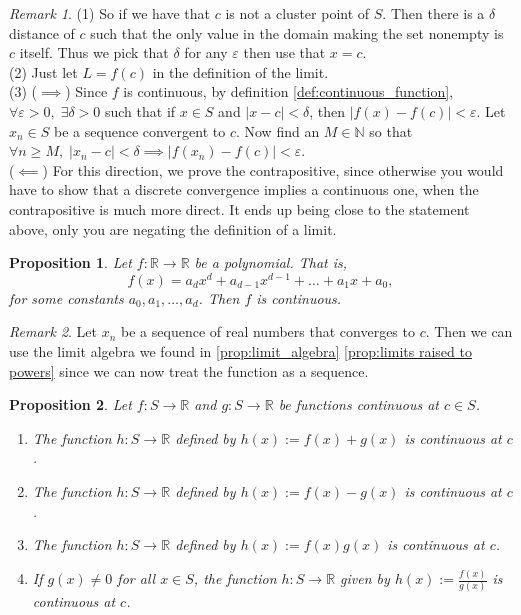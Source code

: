 \documentclass{article}
\newtheorem{proposition}{Proposition}[section]
\theoremstyle{definition}
\theoremstyle{remark}
\newtheorem{remark}{Remark}[section]
\begin{document}
\begin{remark}
(1) \; So if we have that $c$ is not a cluster point of $S$. 
Then there is a $\delta$ distance of $c$ such that 
the only value in the domain making the set nonempty is $c$ itself. 
Thus we pick that $\delta$ for any $\varepsilon$ then use that $x = c$.\\
(2) \indent Just let $L=f(c)$ in the definition of the limit. \\
(3) \indent ($\implies$) Since $f$ is continuous, by definition \ref{def:continuous_function}, 
$\forall \varepsilon > 0, \; \exists \delta > 0$ such that if $x \in S$ and $|x - c| < \delta$, 
then $|f(x)-f(c)| < \varepsilon$. Let $x_n \in S$ be a sequence convergent to $c$. Now find an $M \in \mathbb{N}$ so that $\forall n \geq M, \; |x_n-c| < \delta \implies |f(x_n) - f(c)|<\varepsilon$.\\
\indent ($\impliedby$) For this direction, we prove the contrapositive, since otherwise you 
would have to show that a discrete convergence implies a continuous one, when the contrapositive is much more direct. 
It ends up being close to the statement above, only you are negating the definition of a limit.
\end{remark}




\vspace{.5cm}
\begin{proposition}
Let $f : \mathbb{R} \to \mathbb{R}$ be a polynomial. That is,
\[
f(x) = a_d x^d + a_{d-1} x^{d-1} + \dots + a_1 x + a_0,
\]
for some constants $a_0, a_1, \dots, a_d$. Then $f$ is continuous.
\end{proposition}

\begin{remark}
Let $x_n$ be a sequence of real numbers that converges to $c$. Then we can use the limit algebra 
we found in \ref{prop:limit_algebra} \ref{prop:limits raised to powers} since we can now treat the function as a sequence. 
\end{remark}


\vspace{.5cm}
\begin{proposition}
Let $f : S \to \mathbb{R}$ and $g : S \to \mathbb{R}$ be functions continuous at $c \in S$.
\begin{enumerate}
\item The function $h: S \to \mathbb{R}$ defined by $h(x) := f(x) + g(x)$ is continuous at $c$.
\item The function $h: S \to \mathbb{R}$ defined by $h(x) := f(x) - g(x)$ is continuous at $c$.
\item The function $h: S \to \mathbb{R}$ defined by $h(x) := f(x)g(x)$ is continuous at $c$.
\item If $g(x) \neq 0$ for all $x \in S$, the function $h: S \to \mathbb{R}$ given by $h(x) := \frac{f(x)}{g(x)}$ is continuous at $c$.
\end{enumerate}
\end{proposition}
\end{document}
